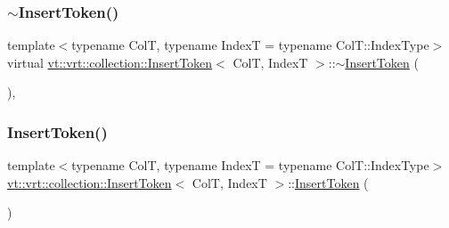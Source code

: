 \mbox{\label{structvt_1_1vrt_1_1collection_1_1_insert_token_a387506c3e013a275665e644d99b75577}} 
\subsubsection{\texorpdfstring{$\sim$\+Insert\+Token()}{~InsertToken()}}
{\footnotesize\ttfamily template$<$typename ColT, typename IndexT = typename Col\+T\+::\+Index\+Type$>$ \\
virtual \hyperlink{structvt_1_1vrt_1_1collection_1_1_insert_token}{vt\+::vrt\+::collection\+::\+Insert\+Token}$<$ ColT, IndexT $>$\+::$\sim$\hyperlink{structvt_1_1vrt_1_1collection_1_1_insert_token}{Insert\+Token} (\begin{DoxyParamCaption}{ }\end{DoxyParamCaption})\hspace{0.3cm}{\ttfamily [virtual]}, {\ttfamily [default]}}

\mbox{\label{structvt_1_1vrt_1_1collection_1_1_insert_token_a4adbc8942df683af9d99216c7d2a40d1}} 
\subsubsection{\texorpdfstring{Insert\+Token()}{InsertToken()}\hspace{0.1cm}{\footnotesize\ttfamily [3/4]}}
{\footnotesize\ttfamily template$<$typename ColT, typename IndexT = typename Col\+T\+::\+Index\+Type$>$ \\
\hyperlink{structvt_1_1vrt_1_1collection_1_1_insert_token}{vt\+::vrt\+::collection\+::\+Insert\+Token}$<$ ColT, IndexT $>$\+::\hyperlink{structvt_1_1vrt_1_1collection_1_1_insert_token}{Insert\+Token} (\begin{DoxyParamCaption}\item[{\hyperlink{structvt_1_1vrt_1_1collection_1_1_insert_token}{Insert\+Token}$<$ ColT, IndexT $>$ const \&}]{ }\end{DoxyParamCaption})\hspace{0.3cm}{\ttfamily [delete]}}

